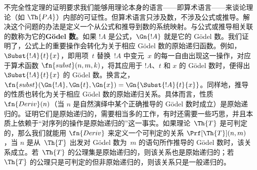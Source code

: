 不完全性定理的证明要求我们能够用理论本身的语言——即算术语言——来谈论理论（如 $\Th{PA}$）内部的可证性。但算术语言只涉及数，不涉及公式或推导。解决这个问题的办法是定义一个从公式和推导到数的系统映射。与公式或推导相关联的数称为它的\textbf{Gödel 数}。如果 $!A$ 是公式，$\Gn{!A}$ 就是它的 Gödel 数。我们证明了，公式上的重要操作会转化为关于相应 Gödel 数的原始递归函数。例如，$\Subst{!A}{t}{x}$，即用项~$t$ 替换~$!A$ 中变元~$x$ 的每一自由出现这一操作，对应于算术函数 $\fn{subst}(n,m,k)$，将其应用于 $!A$、$t$ 和 $x$ 的 Gödel 数时，便得出 $\Subst{!A}{t}{x}$ 的 Gödel 数。换言之，$\fn{subst}(\Gn{!A}, \Gn{t}, \Gn{x}) = \Gn{\Subst{!A}{t}{x}}$。同样地，推导的性质也转化为关于相应 Gödel 数的原始递归关系。具体而言，性质 $\fn{Deriv}(n)$（当 $n$ 是自然演绎中某个正确推导的 Gödel 数时成立）是原始递归的。证明它们是原始递归的，需要相当多的工作，有时还需要一些巧思，并且本质上依赖于“对序列的操作是原始递归的”这一事实。如果理论~$\Th{T}$ 是可判定的，那么我们就能用 $\fn{Deriv}$ 来定义一个可判定的关系 $\Prf[\Th{T}](n, m)$，当 $n$ 是从~$\Th{T}$ 出发对 Gödel 数为~$m$ 的语句所作推导的 Gödel 数时，该关系成立。若~$\Th{T}$ 的公理集是原始递归的，则该关系也是原始递归的；若~$\Th{T}$ 的公理只是可判定的但非原始递归的，则该关系只是一般递归的。